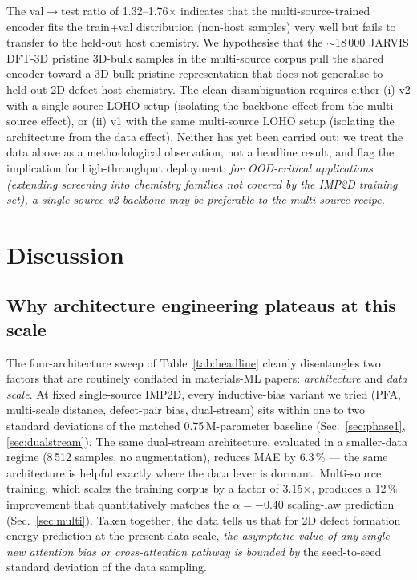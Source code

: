 \documentclass[11pt,a4paper]{article}
\begin{document}
The val$\to$test ratio of 1.32--1.76$\times$ indicates that the
multi-source-trained encoder fits the train+val distribution
(non-host samples) very well but fails to transfer to the held-out
host chemistry. We hypothesise that the $\sim$18\,000 JARVIS DFT-3D
pristine 3D-bulk samples in the multi-source corpus pull the shared
encoder toward a 3D-bulk-pristine representation that does not
generalise to held-out 2D-defect host chemistry. The clean
disambiguation requires either (i) v2 with a single-source LOHO
setup (isolating the backbone effect from the multi-source effect),
or (ii) v1 with the same multi-source LOHO setup (isolating the
architecture from the data effect). Neither has yet been carried
out; we treat the data above as a methodological observation, not a
headline result, and flag the implication for high-throughput
deployment: \emph{for OOD-critical applications (extending screening
into chemistry families not covered by the IMP2D training set), a
single-source v2 backbone may be preferable to the multi-source
recipe.}





\section{Discussion}\label{sec:discuss}

\subsection{Why architecture engineering plateaus at this scale}
The four-architecture sweep of Table~\ref{tab:headline} cleanly
disentangles two factors that are routinely conflated in
materials-ML papers: \emph{architecture} and \emph{data scale}. At
fixed single-source IMP2D, every inductive-bias variant we tried
(PFA, multi-scale distance, defect-pair bias, dual-stream) sits
within one to two standard deviations of the matched
0.75\,M-parameter baseline (Sec.~\ref{sec:phase1},
\ref{sec:dualstream}). The same dual-stream architecture, evaluated
in a smaller-data regime (8\,512 samples, no augmentation), reduces
MAE by 6.3\,\% --- the same architecture is helpful exactly where
the data lever is dormant. Multi-source training, which scales the
training corpus by a factor of 3.15$\times$, produces a 12\,\%
improvement that quantitatively matches the
$\alpha = -0.40$ scaling-law prediction
(Sec.~\ref{sec:multi}). Taken together, the data tells us that for
2D defect formation energy prediction at the present data scale,
\emph{the asymptotic value of any single new attention bias or
cross-attention pathway is bounded by} the seed-to-seed standard
deviation of the data sampling.
\end{document}
